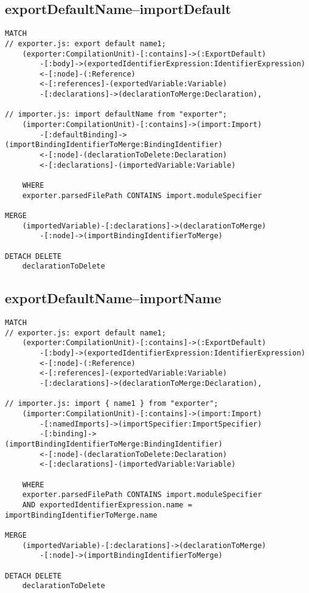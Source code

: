 \newpage
\subsection{exportDefaultName–importDefault}
\begin{lstlisting}[language=Cypher]
MATCH
// exporter.js: export default name1;
    (exporter:CompilationUnit)-[:contains]->(:ExportDefault)
        -[:body]->(exportedIdentifierExpression:IdentifierExpression)
        <-[:node]-(:Reference)
        <-[:references]-(exportedVariable:Variable)
        -[:declarations]->(declarationToMerge:Declaration),

// importer.js: import defaultName from "exporter";
    (importer:CompilationUnit)-[:contains]->(import:Import)
        -[:defaultBinding]->(importBindingIdentifierToMerge:BindingIdentifier)
        <-[:node]-(declarationToDelete:Declaration)
        <-[:declarations]-(importedVariable:Variable)

    WHERE
    exporter.parsedFilePath CONTAINS import.moduleSpecifier

MERGE
    (importedVariable)-[:declarations]->(declarationToMerge)
        -[:node]->(importBindingIdentifierToMerge)

DETACH DELETE
    declarationToDelete
\end{lstlisting}


\newpage
\subsection{exportDefaultName–importName}
\begin{lstlisting}[language=Cypher]
MATCH
// exporter.js: export default name1;
    (exporter:CompilationUnit)-[:contains]->(:ExportDefault)
        -[:body]->(exportedIdentifierExpression:IdentifierExpression)
        <-[:node]-(:Reference)
        <-[:references]-(exportedVariable:Variable)
        -[:declarations]->(declarationToMerge:Declaration),

// importer.js: import { name1 } from "exporter";
    (importer:CompilationUnit)-[:contains]->(import:Import)
        -[:namedImports]->(importSpecifier:ImportSpecifier)
        -[:binding]->(importBindingIdentifierToMerge:BindingIdentifier)
        <-[:node]-(declarationToDelete:Declaration)
        <-[:declarations]-(importedVariable:Variable)

    WHERE
    exporter.parsedFilePath CONTAINS import.moduleSpecifier
    AND exportedIdentifierExpression.name = importBindingIdentifierToMerge.name

MERGE
    (importedVariable)-[:declarations]->(declarationToMerge)
        -[:node]->(importBindingIdentifierToMerge)

DETACH DELETE
    declarationToDelete
\end{lstlisting}


